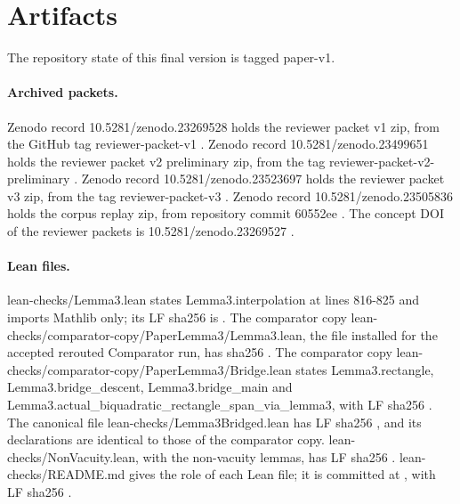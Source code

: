 \section{Artifacts}\label{sec:artifacts}

The repository state of this final version is tagged paper-v1. %

\paragraph{Archived packets.}
Zenodo record 10.5281/zenodo.23269528 holds the reviewer packet v1 zip, from the GitHub tag reviewer-packet-v1 \cite{zenodo-23269528}. %
Zenodo record 10.5281/zenodo.23499651 holds the reviewer packet v2 preliminary zip, from the tag reviewer-packet-v2-preliminary \cite{zenodo-23499651}. %
Zenodo record 10.5281/zenodo.23523697 holds the reviewer packet v3 zip, from the tag reviewer-packet-v3 \cite{zenodo-23523697}. %
Zenodo record 10.5281/zenodo.23505836 holds the corpus replay zip, from repository commit 60552ee \cite{zenodo-23505836}. %
The concept DOI of the reviewer packets is 10.5281/zenodo.23269527 \cite{zenodo-23269527}. %

\paragraph{Lean files.}
lean-checks/Lemma3.lean states Lemma3.interpolation at lines 816-825 and imports Mathlib only; its LF sha256 is . %
The comparator copy lean-checks/comparator-copy/PaperLemma3/Lemma3.lean, the file installed for the accepted rerouted Comparator run, has sha256 . %
The comparator copy lean-checks/comparator-copy/PaperLemma3/Bridge.lean states Lemma3.rectangle, Lemma3.bridge\_descent, Lemma3.bridge\_main and Lemma3.actual\_biquadratic\_rectangle\_span\_via\_lemma3, with LF sha256 . %
The canonical file lean-checks/Lemma3Bridged.lean has LF sha256 , and its declarations are identical to those of the comparator copy. %
lean-checks/NonVacuity.lean, with the non-vacuity lemmas, has LF sha256 . %
lean-checks/README.md gives the role of each Lean file; it is committed at , with LF sha256 . %

